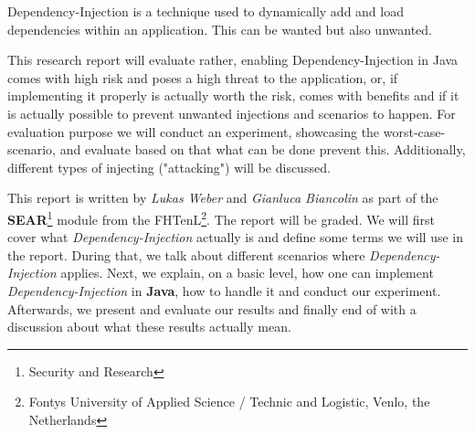 \abstract
Dependency-Injection is a technique used to dynamically add and load dependencies within an application.
This can be wanted but also unwanted.

This research report will evaluate rather, enabling Dependency-Injection in Java comes with high risk and poses a high threat to the application, or, if implementing it properly is actually worth the risk, comes with benefits and if it is actually possible to prevent unwanted injections and scenarios to happen.
For evaluation purpose we will conduct an experiment, showcasing the worst-case-scenario, and evaluate based on that what can be done prevent this.
Additionally, different types of injecting ("attacking") will be discussed.

This report is written by \textit{Lukas Weber} and \textit{Gianluca Biancolin} as part of the \textbf{SEAR}\footnote{Security and Research} module from the FHTenL\footnote{Fontys University of Applied Science / Technic and Logistic, Venlo, the Netherlands}.
The report will be graded.
We will first cover what \textit{Dependency-Injection} actually is and define some terms we will use in the report.
During that, we talk about different scenarios where \textit{Dependency-Injection} applies.
Next, we explain, on a basic level, how one can implement \textit{Dependency-Injection} in \textbf{Java}, how to handle it and conduct our experiment.
Afterwards, we present and evaluate our results and finally end of with a discussion about what these results actually mean.

\clearpage